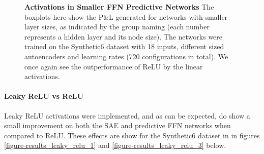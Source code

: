 \documentclass[a4paper,latin]{paper}
\begin{document}
\begin{figure}[H]
\begin{minipage}{0.45\textwidth}
	\caption{\textbf{Activations in Smaller FFN Predictive Networks}
		 \newline The boxplots here show the P\&L generated for networks with smaller layer sizes, as indicated by the group naming (each number represents a hidden layer and its node size). The networks were trained on the Synthetic6 dataset with 18 inputs, different sized autoencoders and learning rates (720 configurations in total). We once again see the outperformance of ReLU by the linear activations.}
	\label{figure-results_linear_vs_relu}
	\end{minipage}
\end{figure}


\paragraph{Leaky ReLU vs ReLU}

Leaky ReLU activations were implemented, and as can be expected, do show a small improvement on both the SAE and predictive FFN networks when compared to ReLU. These effects are show for the Synthetic6 dataset in in figures \ref{figure-results_leaky_relu_1} and \ref{figure-results_leaky_relu_3} below. 

\end{document}
